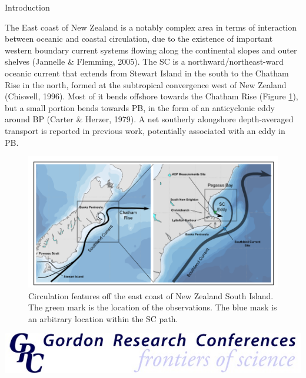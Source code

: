 \documentclass[final]{beamer}
\newlength{\onecolwid}
\begin{document}
\begin{frame}[t]
\begin{columns}[t]
\begin{column}{\onecolwid}
    \begin{block}{Introduction}

    The East coast of New Zealand is a notably complex area in terms of interaction between oceanic and coastal circulation, due to the existence of important western boundary current systems flowing along the continental slopes and outer shelves (Jannelle \& Flemming, 2005). The SC is a northward/northeast-ward oceanic current that extends from Stewart Island in the south to the Chatham Rise in the north, formed at the subtropical convergence west of New Zealand (Chiswell, 1996). Most of it bends offshore towards the Chatham Rise (Figure \ref{schematics}), but a small portion bends towards PB, in the form of an anticyclonic eddy around BP (Carter \& Herzer, 1979). A net southerly alongshore depth-averaged transport is reported in previous work, potentially associated with an eddy in PB. 
    \begin{figure}
    \includegraphics[width=1.0\linewidth]{schematics.png}
    \caption{\label{schematics} Circulation features off the east coast of New Zealand South Island. The green mark is the location of the observations. The blue mask is an arbitrary location within the SC path.}
    \end{figure}


    \end{block}


    \includegraphics[width=1.0\linewidth]{GordonCRC.jpg}




\end{column}
\end{columns}
\end{frame}
\end{document}
